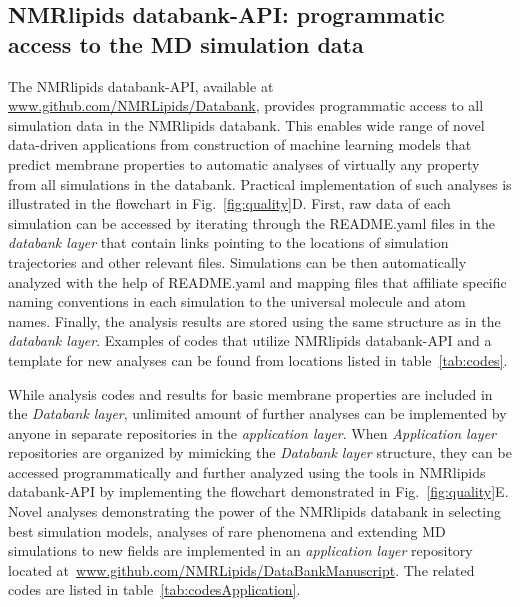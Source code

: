 \documentclass[fleqn,10pt]{wlscirep}
\begin{document}
\subsection{NMRlipids databank-API: programmatic access to the MD simulation data}
The NMRlipids databank-API, available at \url{www.github.com/NMRLipids/Databank}, provides programmatic access to all simulation data in the NMRlipids databank. This enables wide range of novel data-driven applications from construction of machine learning models that predict membrane properties to automatic analyses of virtually any property from all simulations in the databank. Practical implementation of such analyses is illustrated in the flowchart in Fig.~\ref{fig:quality}D. First, raw data of each simulation can be accessed by iterating through the README.yaml files in the {\it databank layer} that contain links pointing to the locations of simulation trajectories and other relevant files. Simulations can be then automatically analyzed with the help of README.yaml and mapping files that affiliate specific naming conventions in each simulation to the universal molecule and atom names. Finally, the analysis results are stored using the same structure as in the {\it databank layer}. Examples of codes that utilize NMRlipids databank-API and a template for new analyses can be found from locations listed in table~\ref{tab:codes}.

While analysis codes and results for basic membrane properties 
are included in the {\it Databank layer}, unlimited amount of further analyses can be implemented by anyone in separate repositories in the {\it application layer}. When {\it Application layer} repositories are organized by mimicking the {\it Databank layer} structure, they can be accessed programmatically and further analyzed using the tools in NMRlipids databank-API by implementing the flowchart demonstrated in Fig.~\ref{fig:quality}E. Novel analyses demonstrating the power of the NMRlipids databank in selecting best simulation models, analyses of rare phenomena and extending MD simulations to new fields are implemented in an {\it application layer} repository located at~\url{www.github.com/NMRLipids/DataBankManuscript}. The related codes are listed in table~\ref{tab:codesApplication}.

\end{document}
